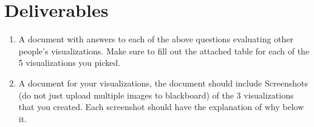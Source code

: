 \documentclass[12pt]{article}
\begin{document}
    \section*{Deliverables}
    \begin{enumerate}
        \item A document with answers to  each of the above questions evaluating other people's visualizations.  Make sure to fill out the attached table for each of the 5 visualizations you picked.  
        \item A document for your visualizations, the document should include Screenshots (do not just upload multiple images to blackboard) of the 3 visualizations that you created.  Each screenshot should have the explanation of why below it.
    \end{enumerate}
\end{document}
